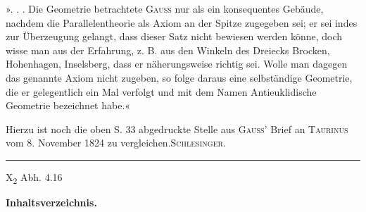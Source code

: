 \par
». . . Die Geometrie betrachtete \textsc{Gauss} nur als ein konsequentes Gebäude,
nachdem die Parallelentheorie als Axiom an der Spitze zugegeben sei; er sei
indes zur Überzeugung gelangt, dass dieser Satz nicht bewiesen werden könne,
doch wisse man aus der Erfahrung, z. B. aus den Winkeln des Dreiecks
Brocken, Hohenhagen, Inselsberg, dass er näherungsweise richtig sei. Wolle
man dagegen das genannte Axiom nicht zugeben, so folge daraus eine selbständige
Geometrie, die er gelegentlich ein Mal verfolgt und mit dem Namen
Antieuklidische Geometrie bezeichnet habe.«
\par\smallskip\begingroup\small
Hierzu ist noch die oben S. 33 abgedruckte Stelle aus \textsc{Gauss}’ Brief an \textsc{Taurinus} vom 8. November
1824 zu vergleichen.\hfill\textsc{Schlesinger}.
\par\medskip\begin{center}\rule{.23\linewidth}{.3pt}\end{center}
\par\smallskip\noindent X\textsubscript{2} Abh. 4.\hfill 16\par\endgroup
\clearpage{}\NoSourceHead
\begin{center}\textbf{Inhaltsverzeichnis.}\end{center}
\begingroup\fontsize{8.5}{11.5}\selectfont
\setlength{\tabcolsep}{3pt}
\newcommand{\TP}[1]{{\fontsize{8}{10}\selectfont\textls[350]{#1}}}
\newcommand{\CT}[4]{#1 & #2\ #3 & #4\\}
